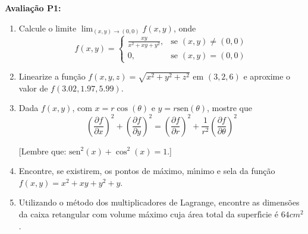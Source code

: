 \documentclass[a4paper,5pt]{amsbook}
\newcommand{\sen}{\text{sen}}
\newcommand{\ds}{\displaystyle}
\begin{document}
\vspace{0.2cm}
\textbf{Avalia\c{c}\~ao P1:}
\begin{enumerate}
\item Calcule o limite $\ds\lim_{(x,y)\rightarrow(0,0)} f(x,y)$, onde 
	$$f(x,y) = \left\{
		\begin{array}{cl}
			\ds\frac{xy}{x^2+xy+y^2}, & \mbox{se } (x,y) \neq (0,0) \\
			0, & \mbox{se } (x,y) = (0,0)
		\end{array}\right.$$
\vspace{0.5cm}

\item Linearize a fun\c{c}\~ao $f(x,y,z) = \sqrt{x^2+y^2+z^2}$ em $(3, 2, 6)$ e  %
	aproxime o valor de $f(3.02, 1.97, 5.99)$.  %
\vspace{0.5cm}

\item Dada $f(x,y)$, com $x=r\cos(\theta)$ e $y=r\sen(\theta)$, mostre que  %
	\begin{equation*}
	\ds{\left(\frac{\partial f}{\partial x}\right)}^2 + {\left(\frac{\partial f}{\partial y}\right)}^2 =
	{\left(\frac{\partial f}{\partial r}\right)}^2 + \frac{1}{r^2}{\left(\frac{\partial f}{\partial \theta}\right)}^2
	\end{equation*}

[Lembre que: $\sen^2(x) + \cos^2(x) = 1$.]
\vspace{0.5cm}

\item Encontre, se existirem, os pontos de m\'aximo, m\'{\i}nimo e sela da fun\c{c}\~ao
	$f(x,y) = x^2 + xy + y^2 + y$.  %
\vspace{0.5cm}

\item Utilizando o m\'etodo dos multiplicadores de Lagrange, encontre as
	dimens\~oes da caixa retangular com volume m\'aximo cuja \'area total da
	superf\'{\i}cie \'e $64cm^2$.
\vspace{0.5cm}
\end{enumerate}
\end{document}
